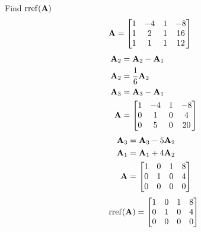 \documentclass{article}
\DeclareMathOperator{\rref}{rref}
\begin{document}
Find $ \rref(\matr{A}) $
\begin{align*}
	\mathbf{A} & = \begin{bmatrix}
		1 & -4 & 1 & -8 \\
		1 & 2 & 1 & 16 \\
		1 & 1 & 1 & 12
	\end{bmatrix}
\end{align*}
\begin{align*}
	\mathbf{A}_2 & = \mathbf{A}_2 - \mathbf{A}_1 \\
	\mathbf{A}_2 & = \frac{1}{6}\mathbf{A}_2 \\
	\mathbf{A}_3 & = \mathbf{A}_3 - \mathbf{A}_1 \\
	\mathbf{A} & = \begin{bmatrix}
		1 & -4 & 1 & -8 \\
		0 & 1 & 0 & 4 \\
		0 & 5 & 0 & 20
	\end{bmatrix}
\end{align*}
\begin{align*}
	\mathbf{A}_3 & = \mathbf{A}_3 - 5\mathbf{A}_2 \\
	\mathbf{A}_1 & = \mathbf{A}_1 + 4\mathbf{A}_2 \\
	\mathbf{A} & = \begin{bmatrix}
		1 & 0 & 1 & 8 \\
		0 & 1 & 0 & 4 \\
		0 & 0 & 0 & 0
	\end{bmatrix}
\end{align*}
\begin{equation*}
	\rref(\matr{A}) = \begin{bmatrix}
		1 & 0 & 1 & 8 \\
		0 & 1 & 0 & 4 \\
		0 & 0 & 0 & 0
	\end{bmatrix}
\end{equation*}
\end{document}
